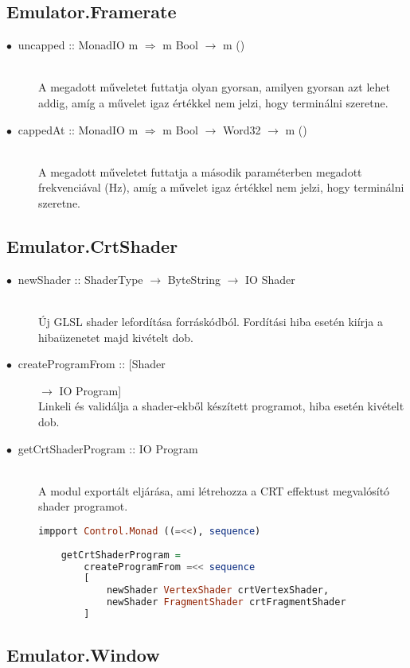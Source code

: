 \subsection{Emulator.Framerate}

\begin{description}
	\item[$\bullet\:$ uncapped :: MonadIO m $\Rightarrow$ m Bool $\rightarrow$ m ()] \hfill \\
	A megadott műveletet futtatja olyan gyorsan, amilyen gyorsan azt lehet addig, amíg a művelet igaz értékkel nem jelzi, hogy terminálni szeretne.
	\item[$\bullet\:$ cappedAt :: MonadIO m $\Rightarrow$ m Bool $\rightarrow$ Word32 $\rightarrow$ m ()] \hfill \\
	A megadott műveletet futtatja a második paraméterben megadott frekvenciával (Hz), amíg a művelet igaz értékkel nem jelzi, hogy terminálni szeretne.
\end{description}

\subsection{Emulator.CrtShader}

\begin{description}
	\item[$\bullet\:$ newShader :: ShaderType $\rightarrow$ ByteString $\rightarrow$ IO Shader] \hfill \\
	Új GLSL shader lefordítása forráskódból. Fordítási hiba esetén kiírja a hibaüzenetet majd kivételt dob.
	\item[$\bullet\:$ createProgramFrom :: [Shader] $\rightarrow$ IO Program] \hfill \\
	Linkeli és validálja a shader-ekből készített programot, hiba esetén kivételt dob.
	\item[$\bullet\:$ getCrtShaderProgram :: IO Program] \hfill \\
	A modul exportált eljárása, ami létrehozza a CRT effektust megvalósító shader programot.
	\begin{lstlisting}[language=Haskell]
	impport Control.Monad ((=<<), sequence)
	
	getCrtShaderProgram = 
		createProgramFrom =<< sequence 
		[
			newShader VertexShader crtVertexShader, 
			newShader FragmentShader crtFragmentShader
		]
	\end{lstlisting}
\end{description}

\subsection{Emulator.Window}


